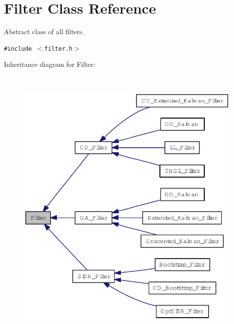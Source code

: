 \hypertarget{class_filter}{
\section{Filter Class Reference}
\label{class_filter}
}
Abstract class of all filters.  


{\tt \#include $<$filter.h$>$}

Inheritance diagram for Filter:\nopagebreak
\begin{figure}[H]
\begin{center}
\leavevmode
\includegraphics[height=400pt]{class_filter__inherit__graph}
\end{center}
\end{figure}
